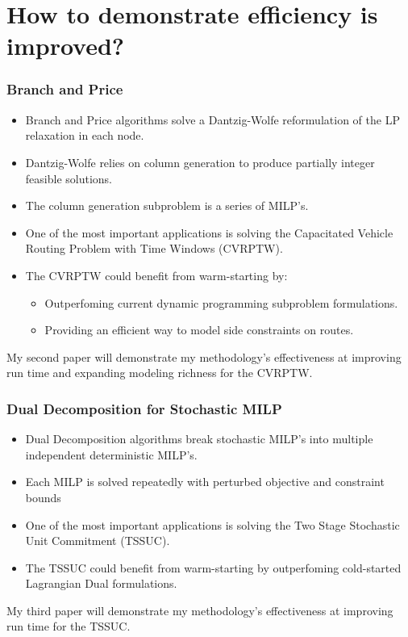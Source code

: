 \documentclass{beamer}
\begin{document}
	\section{How to demonstrate efficiency is improved?}
	
	\begin{frame}[t]
		\frametitle{Branch and Price}
		\small
		\vspace{0cm}
		\begin{itemize}
			\item Branch and Price algorithms solve a Dantzig-Wolfe reformulation of the LP relaxation in each node.
			\item Dantzig-Wolfe relies on column generation to produce partially integer feasible solutions.
			\item The column generation subproblem is a series of MILP's.
			\item One of the most important applications is solving the Capacitated Vehicle Routing Problem with Time Windows (CVRPTW).
			\item The CVRPTW could benefit from warm-starting by:
			\begin{itemize}
				\item Outperfoming current dynamic programming subproblem formulations.
				\item Providing an efficient way to model side constraints on routes.
			\end{itemize}
		\end{itemize}
		\vspace{0cm}
		\begin{block}{}
			My second paper will demonstrate my methodology's effectiveness at improving run time and expanding modeling richness for the CVRPTW.
		\end{block}
		\normalsize
	\end{frame}

	\begin{frame}[t]
		\frametitle{Dual Decomposition for Stochastic MILP}
		\small
		\vspace{0cm}
		\begin{itemize}
			\item Dual Decomposition algorithms break stochastic MILP's into multiple independent deterministic MILP's.
			\item Each MILP is solved repeatedly with perturbed objective and constraint bounds
			\item One of the most important applications is solving the Two Stage Stochastic Unit Commitment (TSSUC).
			\item The TSSUC could benefit from warm-starting by outperfoming cold-started Lagrangian Dual formulations.
		\end{itemize}
		\vspace{1.5cm}
		\begin{block}{}
			My third paper will demonstrate my methodology's effectiveness at improving run time for the TSSUC.
		\end{block}
		\normalsize
	\end{frame}
	
\end{document}
